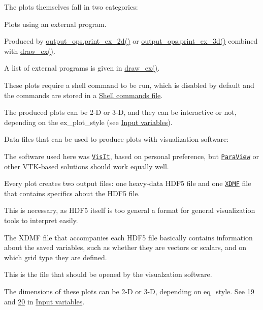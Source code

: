 The plots themselves fall in two categories\+:
\begin{DoxyItemize}
\item Plots using an external program.
\begin{DoxyItemize}
\item Produced by \hyperlink{interfaceoutput__ops_1_1print__ex__2d}{output\+\_\+ops.\+print\+\_\+ex\+\_\+2d()} or \hyperlink{interfaceoutput__ops_1_1print__ex__3d}{output\+\_\+ops.\+print\+\_\+ex\+\_\+3d()} combined with \hyperlink{namespaceoutput__ops_a50bfbb88cc91805469353c3ff47b3e2e}{draw\+\_\+ex()}.
\item A list of external programs is given in \hyperlink{namespaceoutput__ops_a50bfbb88cc91805469353c3ff47b3e2e}{draw\+\_\+ex()}.
\item These plots require a shell command to be run, which is disabled by default and the commands are stored in a \hyperlink{page_outputs_output_file_shell}{Shell commands file}.
\item The produced plots can be 2-\/D or 3-\/D, and they can be interactive or not, depending on the {\ttfamily ex\+\_\+plot\+\_\+style} (see \hyperlink{page_inputs}{Input variables}).
\end{DoxyItemize}
\item Data files that can be used to produce plots with visualization software\+:
\begin{DoxyItemize}
\item The software used here was \href{https://visit.llnl.gov/}{\tt Vis\+It}, based on personal preference, but \href{https://www.paraview.org/}{\tt Para\+View} or other V\+T\+K-\/based solutions should work equally well.
\item Every plot creates two output files\+: one heavy-\/data H\+D\+F5 file and one \href{www.xdmf.org/}{\tt X\+D\+MF} file that contains specifics about the H\+D\+F5 file.
\item This is necessary, as H\+D\+F5 itself is too general a format for general visualization tools to interpret easily.
\item The X\+D\+MF file that accompanies each H\+D\+F5 file basically contains information about the saved variables, such as whether they are vectors or scalars, and on which grid type they are defined.
\item This is the file that should be opened by the visualzation software.
\item The dimensions of these plots can be 2-\/D or 3-\/D, depending on {\ttfamily eq\+\_\+style}. See \hyperlink{page_inputs_fni19}{19} and \hyperlink{page_inputs_fni20}{20} in \hyperlink{page_inputs}{Input variables}.
\end{DoxyItemize}
\end{DoxyItemize}

